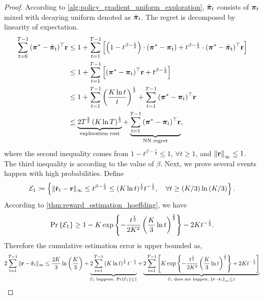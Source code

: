\begin{proof}
    According to \cref{alg:policy_gradient_uniform_exploration}, $\tilde{{\boldsymbol{\pi}}}_t$ consists of ${\boldsymbol{\pi}}_t$ mixed with decaying uniform denoted as $\bar{{\boldsymbol{\pi}}}_t$. The regret is decomposed by linearity of expectation.
\begin{equation}
\label{eq:total_regret_decomposition_appendix}
\begin{split}
    \sum\limits_{t=0}^{T-1}{ ( {{\boldsymbol{\pi}}^*} - \tilde{{\boldsymbol{\pi}}}_t )^\top {\mathbf{r}} } &\le 1 + \sum\limits_{t=1}^{T-1}{ \left[ \left( 1 - t^{ \beta - \frac{1}{3}} \right) \cdot \left( {{\boldsymbol{\pi}}^*} - {\boldsymbol{\pi}}_t \right) + t^{ \beta - \frac{1}{3}} \cdot ( {{\boldsymbol{\pi}}^*} - \bar{{\boldsymbol{\pi}}}_t )^\top {\mathbf{r}} \right]} \\
    &\le 1 + \sum\limits_{t=1}^{T-1}{ \left[ ( {{\boldsymbol{\pi}}^*} - {\boldsymbol{\pi}}_t )^\top {\mathbf{r}} + t^{ \beta - \frac{1}{3}} \right]} \\
    &\le 1 + \sum\limits_{t=1}^{T-1}{ \left( \frac{ K \ln{t} }{t} \right)^{\frac{1}{3}} } + \sum\limits_{t=1}^{T-1}{ ( {{\boldsymbol{\pi}}^*} - {\boldsymbol{\pi}}_t )^\top {\mathbf{r}} } \\
    &\le \underbrace{ 2 T^{\frac{2}{3}} \left( K \ln{T} \right)^{\frac{1}{3}} }_{\text{exploration cost}}+ \underbrace{ \sum\limits_{t=1}^{T-1}{ ( {{\boldsymbol{\pi}}^*} - {\boldsymbol{\pi}}_t )^\top {\mathbf{r}} }}_{\text{NN regret}},
\end{split}
\end{equation}
where the second inequality comes from $1 - t^{ \beta - \frac{1}{3}} \le 1$, $\forall t \ge 1$, and $\left\| {\mathbf{r}} \right\|_\infty \le 1$. The third inequality is according to the value of $\beta$. Next, we prove several events happen with high probabilities. Define
\begin{equation*}
    {\mathcal{E}}_1 \coloneqq \left\{ \| \hat{{\mathbf{r}}}_t - {\mathbf{r}} \|_\infty \le t^{\beta - \frac{1}{3}} \le ( K \ln{t} ) ^\frac{1}{3} t^{- \frac{1}{3}}, \quad \forall t \ge (K/3) \ln{\left(K/3\right) } \right\}.
\end{equation*}
According to \cref{thm:reward_estimation_hoeffding}, we have 
\begin{equation*}
    \operatorname*{Pr}\left\{ {\mathcal{E}}_1 \right\} \ge
    1 - K \exp\left\{ - \frac{t^{\frac{1}{3}}}{2 K^2} \left( \frac{K}{3} \ln{t} \right)^{\frac{2}{3}} \right\} - 2 K t^{- \frac{1}{3}}.
\end{equation*}
Therefore the cumulative estimation error is upper bounded as,
\begin{equation}
\label{eq:estimation_upper_bound_appendix}
\begin{split}
    2 \sum\limits_{t=1}^{T-1}{ \| \rvr - \hat{\rvr}_t \|_\infty } &\le \frac{2 K}{3} \ln{\left(\frac{K}{3}\right) } + \underbrace{2 \sum\limits_{t=1}^{T-1}{ \left( K \ln{t} \right) ^\frac{1}{3} t^{- \frac{1}{3}} }}_{\gE_1 \text{ happens, } \probability\left\{ \gE_1 \right\} \le 1} + \underbrace{ 2  \sum\limits_{t=1}^{T-1}{ \left[ K \exp\left\{ - \frac{t^{\frac{1}{3}}}{2 K^2} \left( \frac{K}{3} \ln{t} \right)^{\frac{2}{3}} \right\} + 2 K t^{- \frac{1}{3}} \right] } }_{ \gE_1 \text{ does not happen, } \left\| \rvr - \hat{\rvr}_t \right\|_\infty \le 1 } \\

\end{split}
\end{equation}
\end{proof}
